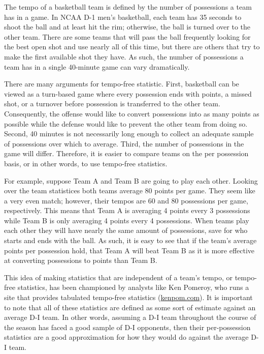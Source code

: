 \documentclass[5p, preprint]{elsarticle}
\begin{document}
The tempo of a basketball team is defined by the number of possessions a team has in a game. In NCAA D-1 men's basketball, each team has 35 seconds to shoot the ball and at least hit the rim; otherwise, the ball is turned over to the other team.  There are some teams that will pass the ball frequently looking for the best open shot and use nearly all of this time, but there are others that try to make the first available shot they have. As such, the number of possessions a team has in a single 40-minute game can vary dramatically. 

There are many arguments for tempo-free statistic. First, basketball can be viewed as a turn-based game where every possession ends with points, a missed shot, or a turnover before possession is transferred to the other team. Consequently, the offense would like to convert possessions into as many points as possible while the defense would like to prevent the other team from doing so. Second, 40 minutes is not necessarily long enough to collect an adequate sample of possessions over which to average. Third,  the number of possessions in the game will differ. Therefore,  it is easier to compare teams on the per possession basis, or in other words, to use tempo-free statistics.   

For example, suppose Team A and Team B are going to play each other. Looking over the team statistices both teams average 80 points per game. They seem like a very even match; however, their tempos are 60 and 80 possessions per game, respectively. This means that Team A is averaging 4 points every 3 possessions while Team B is only averaging 4 points every 4 possessions. When teams play each other they will have nearly the same amount of possessions, save for who starts and ends with the ball. As such, it is easy to see that if the team's average points per possession hold, that Team A will beat Team B as it is more effective at converting possessions to points than Team B.

This idea of making statistics that are independent of a team's tempo, or tempo-free statistics, has been championed by analysts like Ken Pomeroy, who runs a site that provides tabulated tempo-free statistics (\href{kenpom.com}{kenpom.com}). It is important to note that all of these statistics are defined as some sort of estimate against an average D-I team. In other words, assuming a D-I team  throughout the course of the season has faced a good sample of D-I opponents, then their per-possession statistics are a good approximation for how they would do against the average D-I team. 
\end{document}
